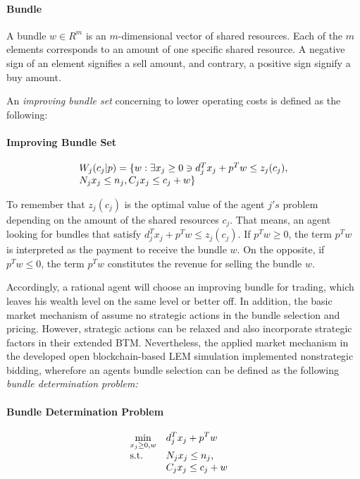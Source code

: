 \paragraph*{Bundle} A bundle $w \in R^{m}$ is an $m$-dimensional vector of shared resources. 
Each of the $m$ elements corresponds to an amount of one specific shared resource. 
A negative sign of an element signifies a sell amount, 
and contrary, a positive sign signify a buy amount. \newline


An \textit{improving bundle set} concerning to lower operating costs is defined as the following:

\paragraph*{Improving Bundle Set}
\begin{equation}
 \begin{array}{ll@{}ll}
 W_{j}(c_{j}|p) = \{w: \exists x_{j} \geq 0 \ni d_{j}^{T}x_{j} + p^{T}w \leq z_{j}(c_{j}), \\
 N_{j}x_{j} \leq n_{j}, C_{j}x_{j} \leq c_{j}+w \}
 \end{array}
\end{equation}

To remember that $z_{j}(c_{j})$ is the optimal value of the agent $j's$ problem depending on the amount of the shared resources $c_{j}$. 
That means, an agent looking for bundles that satisfy 
$d_{j}^{T}x_{j} + p^{T}w \leq z_{j}(c_{j})$. If 
$p^{T}w \geq 0$, the term $p^{T}w$ is interpreted as the payment to receive the bundle $w$.
On the opposite, if $p^{T}w \leq 0$, the term $p^{T}w$ constitutes the revenue for selling the bundle $w$.


Accordingly, a rational agent will choose an improving bundle for trading, 
which leaves his wealth level on the same level or better off. 
In addition, the basic market mechanism of  assume no 
strategic actions in the bundle selection and pricing. However, strategic actions 
can be relaxed and  also incorporate strategic factors
in their extended BTM. 
Nevertheless, the applied market mechanism in the developed open blockchain-based
LEM simulation implemented nonstrategic bidding, wherefore an agents bundle selection 
can be defined as the following \textit{bundle determination problem:}

\paragraph*{Bundle Determination Problem}
\begin{equation}
 \begin{array}{ll@{}ll}
 \underset{x_{j} \geq 0, w}{\text{min}} & \displaystyle d^{T}_{j}x_{j} + p^{T}w &\\
 \text{s.t.}& \displaystyle N_{j}x_{j} \leq n_{j}, &&\\
 & \displaystyle C_{j}x_{j} \leq c_{j}+w
 \end{array}
\end{equation}

